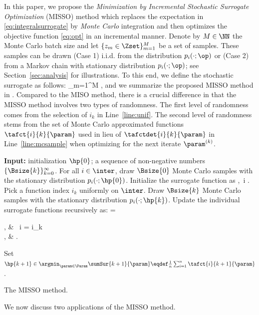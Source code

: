 \documentclass[11pt]{article}
\theoremstyle{t}
\begin{document}
In this paper, we propose the \emph{Minimization by Incremental Stochastic Surrogate Optimization} (MISSO) method  which replaces the expectation in \eqref{eq:integralsurrogate} by \emph{Monte Carlo} integration and then optimizes the objective function \eqref{eq:opt} in an incremental manner.
Denote by $M \in \NN$ the Monte Carlo batch size and let $\{z_m \in \Zset\}_{m=1}^M$ be a set of samples. These samples can be drawn
{\sf (Case 1)} i.i.d. from the distribution $p_i( \cdot ; \op )$ or {\sf (Case 2)}  from a Markov chain with stationary distribution $p_{i}(\cdot; \op)$; see Section~\ref{sec:analysis} for illustrations.
To this end, we define the stochastic surrogate as follows:
\beq \label{eq:ssur}  
 \eqdef {} \sum_{m=1}^{M} \eqsp,
\eeq
and we summarize the proposed MISSO method in . Compared to the MISO method, there is a crucial difference in that 
the MISSO method involves two types of randomness.  The first level of randomness comes from the selection of $i_k$ in Line~\ref{line:unif}. 
The second level of randomness stems from the set of Monte Carlo approximated functions $\tafct{i}{k}{\param}$ used in lieu of $\tafctdet{i}{k}{\param}$ in Line~\ref{line:mcsample} when optimizing for the next iterate $\param^{(k)}$.
\begin{algorithm}[t]
\begin{algorithmic}[1]
\STATE \textbf{Input:} initialization $\hp{0}$; a sequence of non-negative numbers $\{ \Bsize{k} \}_{k=0}^\infty$.
\STATE For all $i \in \inter$, draw $\Bsize{0}$ Monte Carlo samples with the stationary distribution $p_i(\cdot; \hp{0})$.
\STATE Initialize the surrogate function as
\beq\notag
{} \eqdef {},~i \in \inter \eqsp. \vspace{-.2cm}
\eeq
{}
\STATE \label{line:unif}Pick a function index $i_k$ uniformly on $\inter$.
\STATE \label{line:mcsample} Draw $\Bsize{k}$ Monte Carlo samples with the stationary distribution $p_i(\cdot; \hp{k})$.
\STATE \label{line:ssur} Update the individual surrogate functions recursively as:
\beq\notag
{} = \begin{cases}
, & ~i = i_k \\
, & .
\end{cases}
\eeq
\STATE \label{line:iter} Set $\hp{k+1} \in \argmin_{ \param \in \Param } \sumSur{k+1}{\param} \eqdef  \frac{1}{n} \sum_{i=1}^n \tafct{i}{k+1}{\param}$.
\ENDFOR
\end{algorithmic}
\caption{The MISSO method.}
\label{alg:misso}
        \end{algorithm}
We now discuss two applications of the MISSO method.
\end{document}

